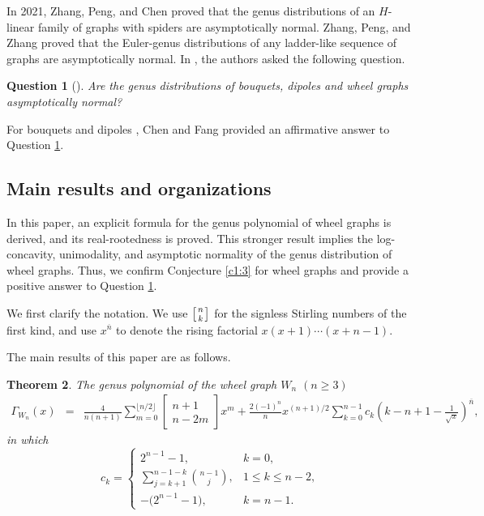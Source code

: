 \documentclass[12pt]{article}
\newtheorem{theorem}{Theorem}[section]
\newtheorem{question}[theorem]{Question}
\theoremstyle{definition}
\begin{document}
In 2021, Zhang, Peng, and Chen \cite{ZPC2021} proved that the genus distributions of an $H$-linear family of graphs with spiders are asymptotically normal. Zhang, Peng, and Zhang \cite{ZPZ2021} proved that  the Euler-genus distributions
of any ladder-like sequence of graphs are asymptotically normal.
In \cite{ZPC2021}, the authors asked the following question.

\begin{question}[\cite{ZPC2021}]\label{q1:4}
 Are the genus distributions of bouquets, dipoles and wheel graphs asymptotically normal?
\end{question}

For bouquets and dipoles , Chen and Fang \cite{ChenFang2022} provided an affirmative answer to Question \ref{q1:4}.


\subsection{Main results and organizations}
In this paper, an explicit formula for the genus polynomial of wheel graphs is derived, and its real-rootedness is proved. This stronger result implies the log-concavity, unimodality, and asymptotic normality of the genus distribution of wheel graphs. Thus, we confirm Conjecture \ref{c1:3} for wheel graphs and provide a positive answer to Question \ref{q1:4}.

We first clarify the notation. We use $\left[ {n \atop k} \right]$ for the signless Stirling numbers of the first kind, and use \(x^{\overline{n}}\) to denote the rising factorial $x(x+1)\cdots(x+n-1)$.

The main results of this paper are as follows.

\begin{theorem}
\label{thm:distribution}
The genus polynomial of the wheel graph $W_n$ $(n\geq 3)$
\begin{eqnarray*}
\Gamma_{W_n}(x) &=& \frac{4}{n(n+1)} \sum_{m=0}^{\lfloor n/2 \rfloor} \begin{bmatrix} n+1 \\ n-2m \end{bmatrix} x^m
+ \frac{2(-1)^n}{n} x^{(n+1)/2} \sum_{k=0}^{n-1} c_k \left(k - n + 1 - \frac{1}{\sqrt{x}}\right)^{\overline{n}},
\end{eqnarray*}
in which
\[
c_k =
\begin{cases}
2^{n-1} - 1, & k = 0, \\[4pt]
\displaystyle \sum_{j=k+1}^{n-1-k} \binom{n-1}{j}, & 1 \le k \le n-2, \\[4pt]
-\bigl(2^{n-1} - 1\bigr), & k = n-1.
\end{cases}
\]
\end{theorem}
\end{document}
